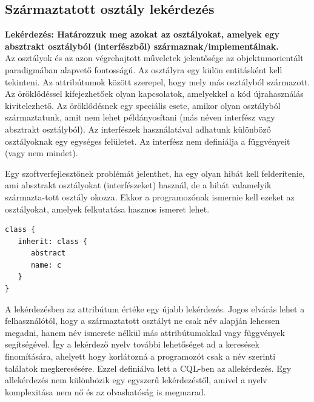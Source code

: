 \documentclass[a4paper,12pt]{report}
\begin{document}
\subsection{Származtatott osztály lekérdezés}
\textbf{Lekérdezés: Határozzuk meg azokat az osztályokat, amelyek egy absztrakt osztályból (interfészből) származnak/implementálnak.}
\\
Az osztályok és az azon végrehajtott műveletek jelentősége az objektumorientált paradigmában alapvető fontosságú. Az osztályra egy külön entitásként kell tekinteni. Az attribútumok között szerepel, hogy mely más osztályból származott. Az öröklődéssel kifejezhetőek olyan kapcsolatok, amelyekkel a kód újrahasználás kivitelezhető. Az öröklődésnek egy speciális esete, amikor olyan osztályból származtatunk, amit nem lehet példányosítani (más néven interfész vagy absztrakt osztályból). Az interfészek használatával adhatunk különböző osztályoknak egy egységes felületet. Az interfész nem definiálja a függvényeit (vagy nem mindet). 
\par Egy szoftverfejlesztőnek problémát jelenthet, ha egy olyan hibát kell felderítenie, ami absztrakt osztályokat (interfészeket) használ, de a hibát valamelyik származta-tott osztály okozza. Ekkor a programozónak ismernie kell ezeket az osztályokat, amelyek felkutatása hasznos ismeret lehet.
\begin{verbatim}
class {
   inherit: class { 
      abstract
      name: c
   }
}
\end{verbatim}
\par A lekérdezésben az attribútum értéke egy újabb lekérdezés. Jogos elvárás lehet a felhasználótól, hogy a származtatott osztályt ne csak név alapján lehessen megadni, hanem név ismerete nélkül más attribútumokkal vagy függvények segítségével. Így a lekérdező nyelv további lehetőséget ad a keresések finomítására, ahelyett hogy korlátozná a programozót csak a név szerinti találatok megkeresésére. Ezzel definiálva lett a CQL-ben az allekérdezés. Egy allekérdezés nem különbözik egy egyszerű lekérdezéstől, amivel a nyelv komplexitása nem nő és az olvashatóság is megmarad. 
\end{document}
